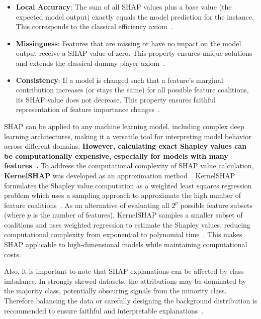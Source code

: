 \begin{itemize}
    \item \textbf{Local Accuracy}: The sum of all SHAP values plus a base value (the expected model output) exactly equals the model prediction for the instance. This corresponds to the classical efficiency axiom~\cite{lundberg2017shap}.
    \item \textbf{Missingness}: Features that are missing or have no impact on the model output receive a SHAP value of zero. This property ensures unique solutions and extends the classical dummy player axiom~\cite{lundberg2017shap}.
    \item \textbf{Consistency}: If a model is changed such that a feature's marginal contribution increases (or stays the same) for all possible feature coalitions, its SHAP value does not decrease. This property ensures faithful representation of feature importance changes~\cite{lundberg2017shap}.
\end{itemize}

SHAP can be applied to any machine learning model, including complex deep learning architectures, making it a versatile tool for interpreting model behavior across different domains. \textbf{However, calculating exact Shapley values can be computationally expensive, especially for models with many features~\cite{rozemberczki2022shapley,aas2021explaining}.}  To address the computational complexity of SHAP value calculation, \textbf{KernelSHAP} was developed as an approximation method~\cite{lundberg2017shap}. KernelSHAP formulates the Shapley value computation as a weighted least squares regression problem which uses a sampling approach to approximate the high number of feature coalitions~\cite{covert2021}. As an alternative of evaluating all $2^p$ possible feature subsets (where $p$ is the number of features), KernelSHAP samples a smaller subset of coalitions and uses weighted regression to estimate the Shapley values, reducing computational complexity from exponential to polynomial time~\cite{rozemberczki2022shapley}. This makes SHAP applicable to high-dimensional models while maintaining computational costs.

Also, it is important to note that SHAP explanations can be affected by class imbalance. In strongly skewed datasets, the attributions may be dominated by the majority class, potentially obscuring signals from the minority class. Therefore balancing the data or carefully designing the background distribution is recommended to ensure faithful and interpretable explanations~\cite{liu2022balancedbackgroundexplanationdata,chen2024interpretable}.

